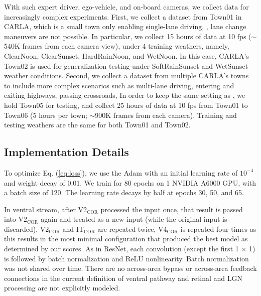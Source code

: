 With such expert driver, ego-vehicle, and on-board cameras, we collect data for increasingly complex experiments. 
First, we collect a dataset from Town01 in CARLA, which is a small town only enabling single-lane driving, {\ie}, lane change maneuvers are not possible. 
In particular, we collect 15 hours of data at 10 fps ($\sim$540K frames from each camera view), under 4 training weathers, namely, ClearNoon, ClearSunset, HardRainNoon, and WetNoon. 
In this case, CARLA's Town02 is used for generalization testing under SoftRainSunset and WetSunset weather conditions. 
Second, we collect a dataset from multiple CARLA's towns to include more complex scenarios such as multi-lane driving, entering and exiting highways, passing crossroads, {\etc} 
In order to keep the same setting as \cite{Hu:2022}, we hold Town05 for testing, and collect 25 hours of data at 10 fps from Town01 to Town06 (5 hours per town; $\sim$900K frames from each camera). 
Training and testing weathers are the same for both Town01 and Town02. 



\subsection{Implementation Details}

\hspace{1pc}To optimize Eq. (\ref{eq:loss}), we use the Adam \cite{Kingma:2015} with an initial learning rate of $10^{-4}$ and weight decay of $0.01$. 
We train for 80 epochs on 1 NVIDIA A6000 GPU, with a batch size of 120. 
The learning rate decays by half at epochs 30, 50, and 65. 

In ventral stream, after V2$_\text{COR}$ processed the input once, that result is passed into V2$_\text{COR}$ again and treated as a new input (while the original input is discarded). 
V2$_\text{COR}$ and IT$_\text{COR}$ are repeated twice, V4$_\text{COR}$ is repeated four times as this results in the most minimal configuration that produced the best model as determined by our scores. 
As in ResNet, each convolution (except the first 1 $ \times $ 1) is followed by batch normalization and ReLU nonlinearity. 
Batch normalization was not shared over time. 
There are no across-area bypass or across-area feedback connections in the current definition of ventral pathway and retinal and LGN processing are not explicitly modeled.



